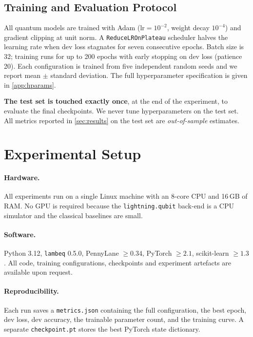 \documentclass[runningheads]{llncs}
\begin{document}
\subsection{Training and Evaluation Protocol}

All quantum models are trained with Adam (\(\text{lr}=10^{-2}\), weight
decay \(10^{-4}\)) and gradient clipping at unit norm. A
\texttt{ReduceLROnPlateau} scheduler halves the learning rate when dev
loss stagnates for seven consecutive epochs. Batch size is 32; training
runs for up to 200 epochs with early stopping on dev loss
(patience 20). Each configuration is trained from five independent
random seeds and we report mean \(\pm\) standard deviation. The full
hyperparameter specification is given in \cref{app:hparams}.

\textbf{The test set is touched exactly once}, at the end of the experiment,
to evaluate the final checkpoints. We never tune hyperparameters on the
test set. All metrics reported in \cref{sec:results} on the test set are
\emph{out-of-sample} estimates.

\section{Experimental Setup}\label{sec:setup}

\paragraph{Hardware.} All experiments run on a single Linux machine with an
8-core CPU and 16\,GB of RAM. No GPU is required because the
\texttt{lightning.qubit} back-end is a CPU simulator and the classical
baselines are small.

\paragraph{Software.} Python 3.12, \texttt{lambeq} 0.5.0, PennyLane
\(\geq 0.34\), PyTorch \(\geq 2.1\), scikit-learn \(\geq 1.3\). All code,
training configurations, checkpoints and experiment artefacts are
available upon request.

\paragraph{Reproducibility.} Each run saves a \texttt{metrics.json}
containing the full configuration, the best epoch, dev loss, dev accuracy,
the trainable parameter count, and the training curve. A separate
\texttt{checkpoint.pt} stores the best PyTorch state dictionary.
\end{document}
